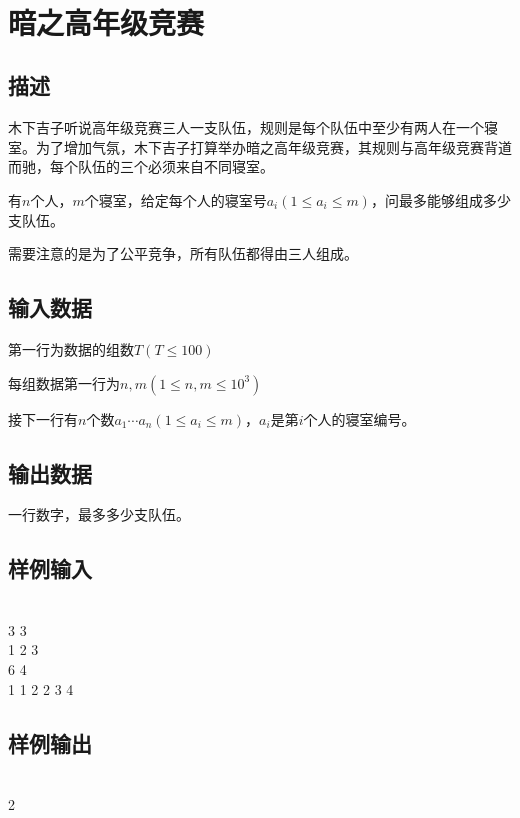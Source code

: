 \documentclass[UTF8]{ctexrep}
\begin{document}
\tt
{}
\fi


\section{暗之高年级竞赛}
\subsection*{描述}
木下吉子听说高年级竞赛三人一支队伍，规则是每个队伍中至少有两人在一个寝室。为了增加气氛，木下吉子打算举办暗之高年级竞赛，其规则与高年级竞赛背道而驰，每个队伍的三个必须来自不同寝室。

有$n$个人，$m$个寝室，给定每个人的寝室号$a_i(1\leqslant a_i \leqslant m)$，问最多能够组成多少支队伍。

需要注意的是为了公平竞争，所有队伍都得由三人组成。

\subsection*{输入数据}
第一行为数据的组数$T(T\leqslant 100)$

每组数据第一行为$n,m(1\leqslant n,m\leqslant 10^3)$

接下一行有$n$个数$a_1\cdots a_n(1\leqslant a_i\leqslant m)$，$a_i$是第$i$个人的寝室编号。

\subsection*{输出数据}
一行数字，最多多少支队伍。

\subsection*{样例输入}
\\
3 3\\
1 2 3\\
6 4\\
1 1 2 2 3 4

\subsection*{样例输出}
\\
2


\ifx\allfiles\undefined
\end{document}
